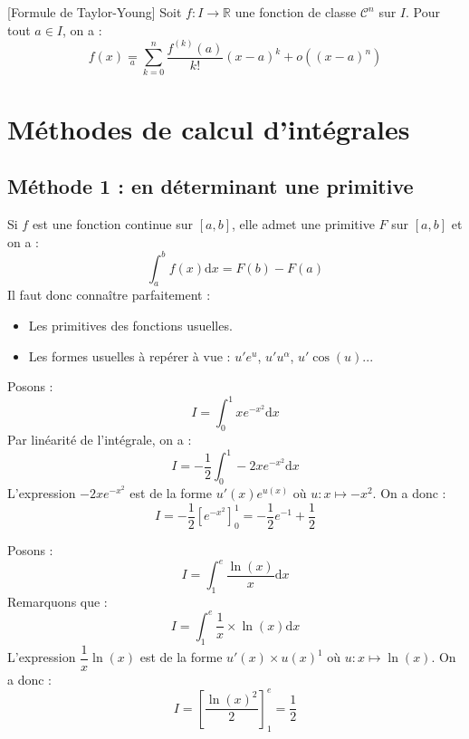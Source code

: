 \documentclass[french,11pt,twoside]{VcCours}
\newcommand{\dx}{\text{d}x}
\begin{document}
%
\begin{Theoreme}{}[Formule de Taylor-Young] Soit $f : I \rightarrow \mathbb{R}$ une fonction de classe $\mathcal{C}^{n}$ sur $I$. Pour tout $a \in I$, on a :
$$ f(x) \underset{ a}{=} \sum_{k=0}^n \frac{f^{(k)}(a)}{k!}(x-a)^k +o((x-a)^n)$$
\end{Theoreme}
%

\section{Méthodes de calcul d'intégrales}
\subsection{Méthode 1 : en déterminant une primitive}
Si $f$ est une fonction continue sur $[a,b]$, elle admet une primitive $F$ sur $[a,b]$ et on a :
$$ \int_{a}^{b} f(x) \dx = F(b)-F(a)$$
Il faut donc connaître parfaitement :
\begin{itemize}
\item Les primitives des fonctions usuelles.
\item Les formes usuelles à repérer  \og à vue \fg : $u'e^u$, $u'u^{\alpha}$, $u'\cos(u)$...
\end{itemize}

\medskip

\begin{Exemple} Posons :
$$ I = \int_{0}^1  xe^{-x^2} \dx$$
Par linéarité de l'intégrale, on a :
$$ I = - \frac{1}{2} \int_{0}^1-2x e^{-x^2} \dx$$
L'expression $-2x e^{-x^2}$ est de la forme $u'(x)e^{u(x)}$ où $u : x \mapsto -x^2$. On a donc :
$$ I = - \frac{1}{2} \left[e^{-x^2}\right]_{0}^1 = - \frac{1}{2}e^{-1} + \frac{1}{2}$$
\end{Exemple}

\begin{Exemple} Posons :
$$ I = \int_{1}^{e}  \frac{\ln(x)}{x} \dx$$
Remarquons que :
$$ I =  \int_{1}^{e} \frac{1}{x} \times \ln(x) \dx$$
L'expression $\dfrac{1}{x} \ln(x)$ est de la forme $u'(x) \times u(x)^1$ où $u : x \mapsto \ln(x)$. On a donc :
$$ I = \left[ \frac{\ln(x)^2}{2} \right]_{1}^{e} = \frac{1}{2}$$
\end{Exemple}
\end{document}

